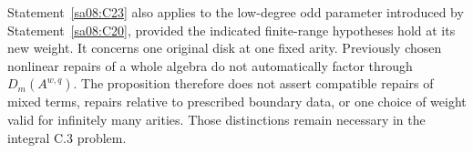 Statement~\ref{sa08:C23} also applies to
the low-degree odd parameter introduced
by Statement~\ref{sa08:C20}, provided
the indicated finite-range hypotheses
hold at its new weight. It concerns
one original disk at one fixed arity.
Previously chosen nonlinear repairs of
a whole algebra do not automatically
factor through $D_m(A^{w,q})$.
The proposition therefore does not
assert compatible repairs of mixed
terms, repairs relative to prescribed
boundary data, or one choice of weight
valid for infinitely many arities.
Those distinctions remain necessary
in the integral C.3 problem.
